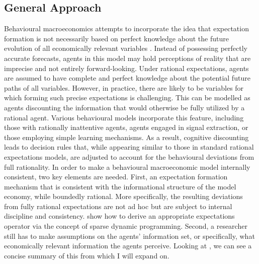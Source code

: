 \documentclass[11pt]{article}
\newcommand{\bb}{\bigbreak\noindent}
\begin{document}
\begin{spacing}{2}
\subsection{General Approach}
Behavioural macroeconomics attempts to incorporate the idea that expectation formation is not necessarily based on perfect knowledge about the future evolution of all economically relevant variables \parencite{woodford2013macroeconomic}. Instead of possessing perfectly accurate forecasts, agents in this model may hold perceptions of reality that are imprecise and not entirely forward-looking. Under rational expectations, agents are assumed to have complete and perfect knowledge about the potential future paths of all variables. However, in practice, there are likely to be variables for which forming such precise expectations is challenging. This can be modelled as agents discounting the information that would otherwise be fully utilized by a rational agent. Various behavioural models incorporate this feature, including those with rationally inattentive agents, agents engaged in signal extraction, or those employing simple learning mechanisms. As a result, cognitive discounting leads to decision rules that, while appearing similar to those in standard rational expectations models, are adjusted to account for the behavioural deviations from full rationality.
\bb
In order to make a behavioural macroeconomic model internally consistent, two key elements are needed. First, an expectation formation mechanism that is consistent with the informational structure of the model economy, while boundedly rational. More specifically, the resulting deviations from fully rational expectations are not ad hoc but are subject to internal discipline and consistency. \cite{gabaix2014sparsity, gabaix2016behavioral} show how to derive an appropriate expectations operator via the concept of sparse dynamic programming. Second, a researcher still has to make assumptions on the agents' information set, or specifically, what economically relevant information the agents perceive. Looking at \cite{lubik2021fiscal}, we can see a concise summary of this from which I will expand on.


\end{spacing}
\end{document}
